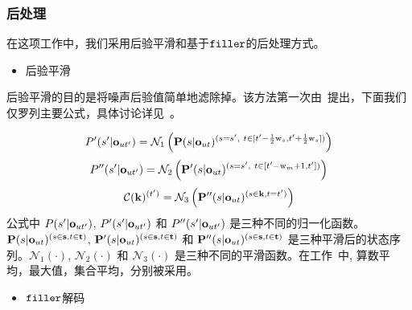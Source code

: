 \subsubsection{后处理}
\label{Sec:post-process}

在这项工作中，我们采用后验平滑和基于$\tt filler$的后处理方式。

\begin{itemize}
  \item 后验平滑
\end{itemize}
后验平滑的目的是将噪声后验值简单地滤除掉。该方法第一次由~\cite{chen2014small}提出，下面我们仅罗列主要公式，具体讨论详见~\cite{chen2018kws}。

\begin{equation}
\label{equ:post-smooth-conf}
\begin{split}
P'(s'|{\bf o}_{ut'})=\mathcal{N}_1\left (\mathbf{P}(s|{\bf o}_{ut})^{(s=s',\ t\in [t'-\frac{1}{2}\mathrm w_{s},t'+\frac{1}{2}\mathrm w_{s}])}\right ) 
\end{split}
\end{equation}
\begin{equation}
\label{equ:post-smooth-conf2}
\begin{split}
P''(s'|{\bf o}_{ut'})=\mathcal{N}_2\left (\mathbf{P}'(s|{\bf o}_{ut})^{(s=s',\ t\in [t'-\mathrm w_{m}+1,t'])}\right ) 
\end{split}
\end{equation}
\begin{equation}
\label{equ:post-smooth-conf3}
\begin{split}
\mathcal C(\mathbf{k})^{(t')}=\mathcal{N}_3\left (\mathbf{P}''(s|{\bf o}_{ut})^{(s\in \mathbf{k},t=t')}\right ) 
\end{split}
\end{equation}
公式中 $P(s'|{\bf o}_{ut'})$, $P'(s'|{\bf o}_{ut'})$ 和 $P''(s'|{\bf o}_{ut'})$ 是三种不同的归一化函数。  $\mathbf{P}(s|{\bf o}_{ut})^{(s\in \mathbf{s},t\in\mathbf{t})}$, $\mathbf{P}'(s|{\bf o}_{ut})^{(s\in \mathbf{s},t\in\mathbf{t})}$ 和 $\mathbf{P}''(s|{\bf o}_{ut})^{(s\in \mathbf{s},t\in\mathbf{t})}$ 是三种平滑后的状态序列。$\mathcal{N}_1(\cdot)$, $\mathcal{N}_2(\cdot)$ 和 $\mathcal{N}_3(\cdot)$ 是三种不同的平滑函数。在工作~\cite{chen2014small}中,  算数平均，最大值，集合平均，分别被采用。

\begin{itemize}
  \item {$\tt filler$解码}
\end{itemize}

